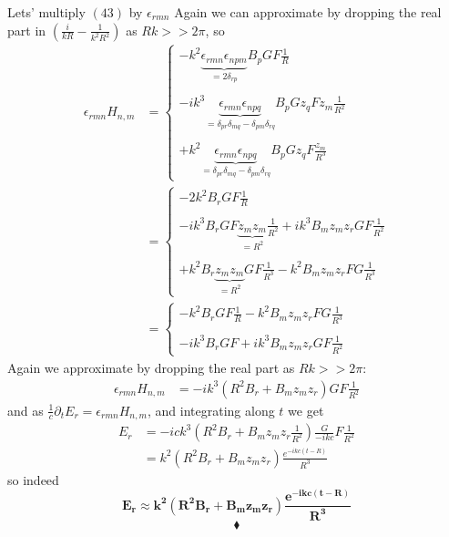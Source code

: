 Lets' multiply $(43)$ by $\epsilon_{rmn}$
Again we can approximate by dropping the real part in $\left(\frac{i}{kR}-\frac{1}{k^2R^2}\right)$ as $Rk>> 2\pi$, so
\begin{align}
\epsilon_{rmn}H_{n,m}&=\left\{\begin{array}{l}
-k^2\underbrace{\epsilon_{rmn}\epsilon_{npm}}_{=2\delta_{rp}}B_pGF\frac{1}{R}\\\\-ik^3\underbrace{\epsilon_{rmn}\epsilon_{npq}}_{=\delta_{pr}\delta_{mq}-\delta_{pm}\delta_{rq}}B_pGz_qFz_m\frac{1}{R^2}\\\\+k^2\underbrace{\epsilon_{rmn}\epsilon_{npq}}_{=\delta_{pr}\delta_{mq}-\delta_{pm}\delta_{rq}}B_pGz_qF\frac{z_{m}}{R^3}\end{array}\right.\\
&=\left\{\begin{array}{l}
-2k^2B_rGF\frac{1}{R}\\\\-ik^3B_rGF\underbrace{z_mz_m}_{=R^2}\frac{1}{R^2}+ik^3B_mz_mz_rGF\frac{1}{R^2}\\\\
+k^2B_r\underbrace{z_{m}z_m}_{=R^2}GF\frac{1}{R^3}-k^2B_mz_{m}z_rFG\frac{1}{R^3}
\end{array}\right.\\
&=\left\{\begin{array}{l}
-k^2B_rGF\frac{1}{R}-k^2B_mz_{m}z_rFG\frac{1}{R^3}\\\\-ik^3B_rGF+ik^3B_mz_mz_rGF\frac{1}{R^2}
\end{array}\right.
\end{align}
Again we approximate by dropping the real part as $Rk>> 2\pi$:
\begin{align}
\epsilon_{rmn}H_{n,m}&=
-ik^3\left(R^2B_r+B_mz_mz_r\right)GF\frac{1}{R^2}
\end{align}
and as $\frac{1}{c}\partial_t E_r = \epsilon_{rmn}H_{n,m}$, and integrating along $t$ we get 
\begin{align}
E_r&=-ick^3\left(R^2B_r+B_mz_mz_r\frac{1}{R^2}\right)\frac{G}{-ikc}F\frac{1}{R^2}\\
&=k^2\left(R^2B_r+B_mz_mz_r\right)\frac{e^{-ikc(t-R)}}{R^3}
\end{align}
so indeed $$\mathbf{E_r\approx k^2\left(R^2B_r+B_mz_mz_r\right)\frac{e^{-ikc(t-R)}}{R^3}}$$
$$\blacklozenge$$
\newpage



